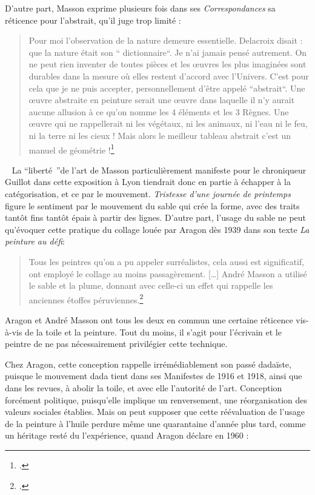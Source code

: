 D’autre part, Masson exprime plusieurs fois dans ses \emph{Correspondances} sa réticence pour l’abstrait, qu’il juge trop limité : 

\begin{quote}
Pour moi l’observation de la nature demeure essentielle. Delacroix disait : que la nature était son “ dictionnaire“. Je n’ai jamais pensé autrement. On ne peut rien inventer de toutes pièces et les \oe{}uvres les plus imaginées sont durables dans la mesure où elles restent d’accord avec l’Univers. C’est pour cela que je ne puis accepter, personnellement d’être appelé “abstrait“. Une \oe{}uvre abstraite en peinture serait une \oe{}uvre dans laquelle il n’y aurait aucune allusion à ce qu’on nomme les 4 éléments et les 3 Règnes. Une \oe{}uvre qui ne rappellerait ni les végétaux, ni les animaux, ni l’eau ni le feu, ni la terre ni les cieux ! Mais alors le meilleur tableau abstrait c’est un manuel de géométrie !\footcite[p464]{anneessurrealistes}\end{quote}
 
	La \enquote{liberté }de l’art de Masson particulièrement manifeste pour le chroniqueur Guillot dans cette exposition à Lyon tiendrait donc en partie à échapper à la catégorisation, et ce par le mouvement. \emph{Tristesse d’une journée de printemps} figure le sentiment par le mouvement du sable qui crée la forme, avec des traits tantôt fins tantôt épais à partir des lignes. D’autre part, l'usage du sable ne peut qu’évoquer cette pratique du collage louée par Aragon dès 1939 dans son texte \emph{La peinture au défi}:
\begin{quote}
Tous les peintres qu’on a pu appeler surréalistes, cela aussi est significatif, ont employé le collage au moins passagèrement. […] André Masson a utilisé le sable et la plume, donnant avec celle-ci un effet qui rappelle les anciennes étoffes péruviennes.\footcite[p78]{ecritssurla}\end{quote}	

 	 Aragon et André Masson ont tous les deux en commun une certaine réticence vis-à-vis de la toile et la peinture. Tout du moins, il s’agit pour l’écrivain et le peintre de ne pas nécessairement privilégier cette technique. 

	Chez Aragon, cette conception rappelle irrémédiablement son passé dadaïste, puisque le mouvement dada tient dans ses Manifestes de 1916 et 1918, ainsi que dans les revues, à abolir la toile, et avec elle l’autorité de l’art. Conception forcément politique, puisqu’elle implique un renversement, une réorganisation des valeurs sociales établies. Mais on peut supposer que cette réévaluation de l’usage de la peinture à l’huile perdure même une quarantaine d’année plus tard, comme un héritage resté du l’expérience, quand Aragon déclare en 1960 : 

